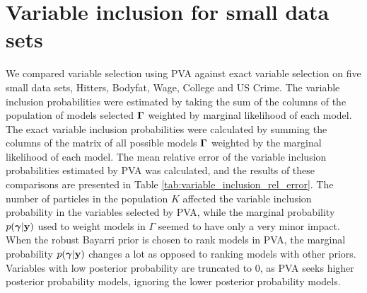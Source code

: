 

\section{Variable inclusion for small data sets}

We compared variable selection using PVA against exact variable selection on five small data sets,
Hitters, Bodyfat, Wage, College and US Crime. 
The variable inclusion probabilities were estimated by taking the sum of the columns of the population
of models selected ${\boldsymbol \Gamma}$
weighted by marginal likelihood of each model.
The exact variable inclusion probabilities were calculated by summing the columns of the matrix of all possible
models ${\boldsymbol \Gamma}$ weighted by the marginal likelihood of each model.
The mean relative error of the variable inclusion probabilities estimated by PVA was calculated,
and the results of these comparisons are presented in Table \ref{tab:variable_inclusion_rel_error}.
The number of particles in the population $K$ affected the
variable inclusion probability in the variables selected by PVA, while the marginal probability
$p({\boldsymbol \gamma} | {\bf y})$ used to weight models in $\Gamma$ seemed to have only a very minor impact.
When the robust Bayarri prior is chosen to rank models in PVA,
the marginal probability $p({\boldsymbol \gamma} | {\bf y})$ changes a lot as opposed to ranking models with other priors.
Variables with low posterior probability are truncated to 0, as PVA seeks higher posterior probability models,
ignoring the lower posterior probability models.

